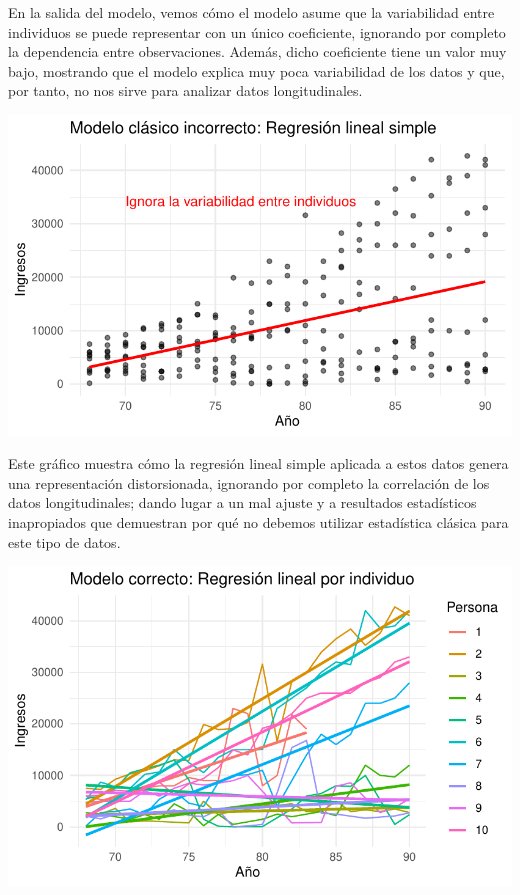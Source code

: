 \documentclass[
  letterpaper,
  DIV=11,
  numbers=noendperiod]{scrreprt}
\begin{document}
En la salida del modelo, vemos cómo el modelo asume que la variabilidad
entre individuos se puede representar con un único coeficiente,
ignorando por completo la dependencia entre observaciones. Además, dicho
coeficiente tiene un valor muy bajo, mostrando que el modelo explica muy
poca variabilidad de los datos y que, por tanto, no nos sirve para
analizar datos longitudinales.

\includegraphics{cap2_files/figure-pdf/unnamed-chunk-3-1.pdf}

Este gráfico muestra cómo la regresión lineal simple aplicada a estos
datos genera una representación distorsionada, ignorando por completo la
correlación de los datos longitudinales; dando lugar a un mal ajuste y a
resultados estadísticos inapropiados que demuestran por qué no debemos
utilizar estadística clásica para este tipo de datos.

\includegraphics{cap2_files/figure-pdf/unnamed-chunk-4-1.pdf}
\end{document}
